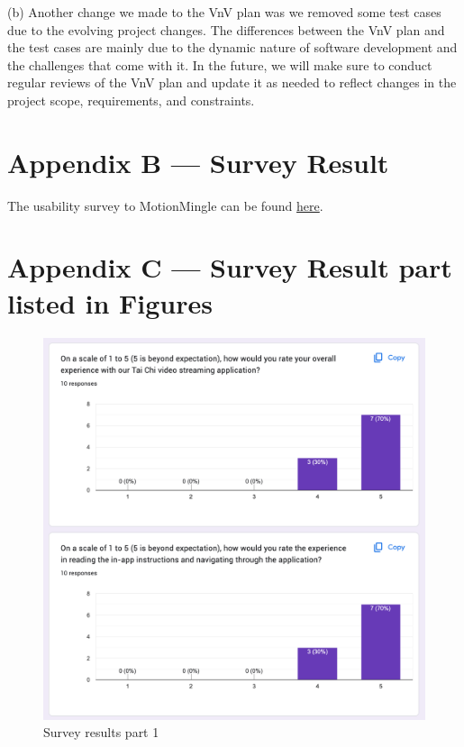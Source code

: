 \documentclass[12pt, titlepage]{article}
\begin{document}
(b) Another change we made to the VnV plan was we removed some test cases due to
the evolving project changes. The differences between the VnV plan and the test
cases are mainly due to the dynamic nature of software development and the
challenges that come with it. In the future, we will make sure to conduct
regular reviews of the VnV plan and update it as needed to reflect changes in
the project scope, requirements, and constraints.

\section*{Appendix B --- Survey Result}
The usability survey to MotionMingle can be found \href{https://docs.google.com/forms/d/e/1FAIpQLSchSdc_kHr98yHP8QPyWItHoP-dj_hJnuEtNByH0V2M_iDjWw/viewform}{here}.

\section*{Appendix C --- Survey Result part listed in Figures}
\FloatBarrier
\begin{figure}[!]
  \centering
  \includegraphics[width=1.0\linewidth]{surveyp1.png}
  \caption{Survey results part 1}
  \label{fig:surveyp1}
\end{figure}
\end{document}
